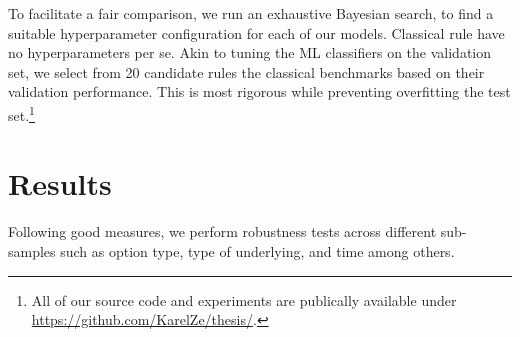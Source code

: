 To facilitate a fair comparison, we run an exhaustive Bayesian search, to find a suitable hyperparameter configuration for each of our models. Classical
rule have no hyperparameters per se. Akin to tuning the \gls{ML} classifiers on the validation set, we select from 20 candidate rules the classical benchmarks based on their validation performance. This is most rigorous while preventing overfitting the test set.\footnote{All of our source code and experiments are publically available under \url{https://github.com/KarelZe/thesis/}.}

\section{Results}

Following good measures, we perform robustness tests across different sub-samples such as option type, type of underlying, and time among others. 



